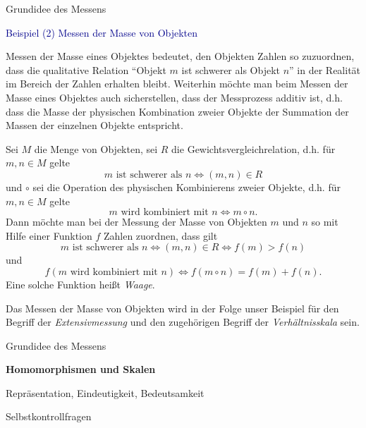 \documentclass[
  8pt,
  ignorenonframetext,
]{beamer}
\begin{document}
\begin{frame}{Grundidee des Messens}
\protect\hypertarget{grundidee-des-messens-2}{}
\small

\textcolor{darkblue}{Beispiel (2) Messen der Masse von Objekten}
\footnotesize

Messen der Masse eines Objektes bedeutet, den Objekten Zahlen so
zuzuordnen, dass die qualitative Relation ``Objekt \(m\) ist schwerer
als Objekt \(n\)'' in der Realität im Bereich der Zahlen erhalten
bleibt. Weiterhin möchte man beim Messen der Masse eines Objektes auch
sicherstellen, dass der Messprozess additiv ist, d.h. dass die Masse der
physischen Kombination zweier Objekte der Summation der Massen der
einzelnen Objekte entspricht.

Sei \(M\) die Menge von Objekten, sei \(R\) die
Gewichtsvergleichrelation, d.h. für \(m,n \in M\) gelte \begin{equation}
m \mbox{ ist schwerer als } n \Leftrightarrow (m,n) \in R
\end{equation} und \(\circ\) sei die Operation des physischen
Kombinierens zweier Objekte, d.h. für \(m,n \in M\) gelte
\begin{equation}
m \mbox{ wird kombiniert mit } n \Leftrightarrow m \circ n.
\end{equation} Dann möchte man bei der Messung der Masse von Objekten
\(m\) und \(n\) so mit Hilfe einer Funktion \(f\) Zahlen zuordnen, dass
gilt \begin{equation}
m \mbox{ ist schwerer als } n \Leftrightarrow (m,n) \in R \Leftrightarrow f(m) > f(n)
\end{equation} und \begin{equation}
f(m \mbox{ wird kombiniert mit } n) \Leftrightarrow f(m \circ n) = f(m) + f(n).
\end{equation} Eine solche Funktion heißt \emph{Waage}.

Das Messen der Masse von Objekten wird in der Folge unser Beispiel für
den Begriff der \emph{Extensivmessung} und den zugehörigen Begriff der
\emph{Verhältnisskala} sein.
\end{frame}

\begin{frame}{}
\protect\hypertarget{section-5}{}
\vfill
\Large
{}

Grundidee des Messens

\textbf{Homomorphismen und Skalen}

Repräsentation, Eindeutigkeit, Bedeutsamkeit

Selbstkontrollfragen \vfill
\end{frame}
\end{document}
